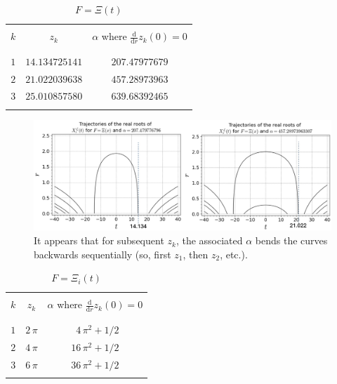 \documentclass[a4paper,11pt,twoside]{amsart}
\newcommand{\verifiedeq}{=}
\newcommand{\verifiedeq}{\stackrel{\checkmark}{=}}
\begin{document}
\small{
\begin{table}[H]
  \begin{center}
    \caption{$F\verifiedeq\Xi(t)$}
    \label{tab:tablezeroes1}
    \begin{tabular}{|c|c|c|} 
      \hline
       & &\\
      $k$ & $z_k$ & $\alpha$ where $\frac{\mathrm{d}}{\mathrm{d} r} z_k(0) = 0$ \\
       & \\
      \hline
       & &\\
      $ 1$ & $14.134725141 $ &$207.47977679$ \\ 
      $ 2$ & $21.022039638 $ &$457.28973963$ \\ 
      $ 3$ & $25.010857580 $ &$639.68392465$ \\ 
       & & \\
       \hline
    \end{tabular}
  \end{center}
\end{table}
}

\begin{figure}[H]
  \includegraphics[width=1\linewidth]{LaguerreCurvedXi.jpg}
  \caption{It appears that for subsequent $z_k$, the associated $\alpha$ bends the curves backwards sequentially (so, first $z_1$, then $z_2$, etc.). }
  \label{fig:flowLcurveXi}
\end{figure}


\small{
\begin{table}[H]
  \begin{center}
    \caption{$F\verifiedeq\Xi_i(t)$}
    \label{tab:tablezeros2}
    \begin{tabular}{|c|c|c|} 
      \hline
       & &\\
      $k$ & $z_k$ & $\alpha$ where $\frac{\mathrm{d}}{\mathrm{d} r} z_k(0) = 0$ \\
       && \\
      \hline
       & &\\
      $ 1$ & $2\,\pi $ &$\,\,\,4\,\pi^2 + 1/2$ \\ 
      $ 2$ & $4\,\pi $ &$16\,\pi^2 + 1/2$ \\ 
      $ 3$ & $6\,\pi $ &$36\,\pi^2 + 1/2$ \\ 
       & &\\
       \hline
    \end{tabular}
  \end{center}
\end{table}
}
\end{document}
